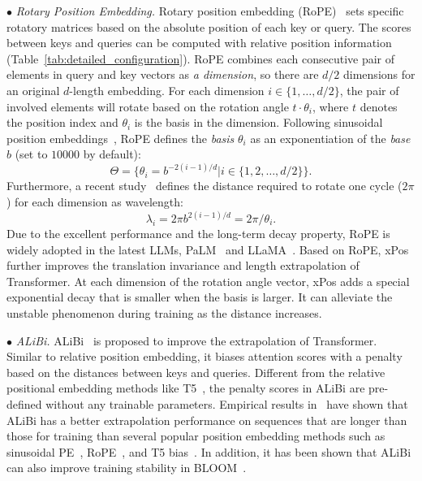 {{    $\bullet$ \emph{Rotary Position Embedding.} 
{Rotary position embedding (RoPE)~\cite{Su-arxiv-2021-Roformer} 
    sets specific rotatory matrices based on the absolute position of each key or query.
    The scores between keys and queries can be computed with relative position information (Table~\ref{tab:detailed_configuration}).} 
    {RoPE combines each consecutive pair of elements in query and key vectors as \emph{a dimension},   so there are $d/2$  dimensions for an original $d$-length embedding. For each dimension $i \in \{1, \dots, d/2\}$, the  pair of involved elements will rotate based on the rotation angle $t\cdot \theta_i$, where $t$ denotes  the position index and $\theta_i$ is the basis in the dimension. Following sinusoidal position embeddings~\cite{Vaswani-NIPS-2017-Attention}, RoPE defines the \emph{basis}  $\theta_i$ as an exponentiation of the \emph{base} $b$ (set to $10000$ by  default):}
\begin{equation}
    \Theta = \{\theta_i = b^{-2(i-1)/d} | i \in \{1, 2, \dots , d/2 \}\}.\label{eq:basis}
\end{equation}
{Furthermore, a recent study~\cite{Peng-arxiv-2023-Yarn} defines the distance required to rotate one cycle ($2\pi$) for each dimension as wavelength:}
\begin{equation}
      \lambda_i = 2\pi b^{2(i-1)/d}=2 \pi / \theta_i.\label{eq:wavelength}
\end{equation}       
Due to the excellent performance and the long-term decay property, RoPE is widely adopted in the latest LLMs, \eg PaLM~\cite{Chowdhery-arxiv-2022-PaLM} and LLaMA~\cite{Touvron-arxiv-2023-LLaMA}. Based on RoPE,  xPos~\cite{Sun-2022-arxiv-Length} further improves the translation invariance and length extrapolation of Transformer. At each dimension of the rotation angle vector, xPos adds a special exponential decay that is smaller when the basis is larger. It can alleviate the unstable phenomenon {during training} as the distance increases. 
    

    $\bullet$ \emph{ALiBi.} ALiBi~\cite{Press-ICLR-2022-Train} is proposed to improve the extrapolation of Transformer. Similar to relative position embedding, it biases attention scores with a penalty based on the distances between keys and queries. 
    {Different from the relative positional embedding methods like T5~\cite{Raffel-JMLR-2020-Exploring}, the penalty scores in ALiBi are pre-defined without any trainable parameters.}
    Empirical results in~\cite{Press-ICLR-2022-Train} have shown that ALiBi has {a better extrapolation performance on sequences that are longer than those for training than several popular 
    position embedding methods such as  sinusoidal PE~\cite{Vaswani-NIPS-2017-Attention}, RoPE~\cite{Su-arxiv-2021-Roformer}, and T5 bias~\cite{Raffel-JMLR-2020-Exploring}. }
    In addition, it has been shown that ALiBi can also improve training stability in BLOOM~\cite{Scao-arxiv-2022-BLOOM}.



}}
